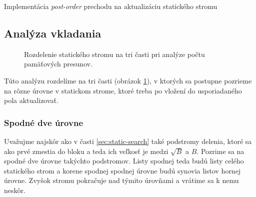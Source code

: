 \begin{algorithm}
    \caption{Implementácia \emph{post-order} prechodu na aktualizáciu statického stromu}
    \label{alg:postorder}
    \begin{algorithmic}[1]
         
        \Statex {}
        \Statex
             
                \State \Return {}
            \EndIf
            \Statex
            \Else
                \State {} 
                \State {} 
                \Statex
                 
            \EndIf           
        \EndFunction
    \end{algorithmic}
\end{algorithm}

\subsection{Analýza vkladania}

\begin{figure}
    \centering
    \resizebox{\textwidth}{!}{
        
    }
    \caption[Rozdelenie statického stromu]{Rozdelenie statického stromu na tri časti pri analýze počtu pamäťových presunov.}
    \label{fig:cobtree_analysis_parts}
\end{figure}

Túto analýzu rozdelíme na tri časti (obrázok \ref{fig:cobtree_analysis_parts}), v ktorých sa postupne pozrieme na rôzne úrovne v statickom strome, ktoré treba po vložení do usporiadaného pola aktualizovať.

\subsubsection{Spodné dve úrovne}
Uvažujme najskôr ako v časti \ref{sec:static-search} také podstromy \vEB delenia, ktoré sa ako prvé zmestia do bloku \cache a teda ich veľkosť je medzi $\sqrt{B}$ a $B$. Pozrime sa na spodné dve úrovne takýchto podstromov. Listy spodnej teda budú listy celého statického strom a korene spodnej spodnej úrovne budú synovia listov hornej úrovne. Zvyšok stromu pokračuje nad týmito úrovňami a vrátime sa k nemu neskôr.


